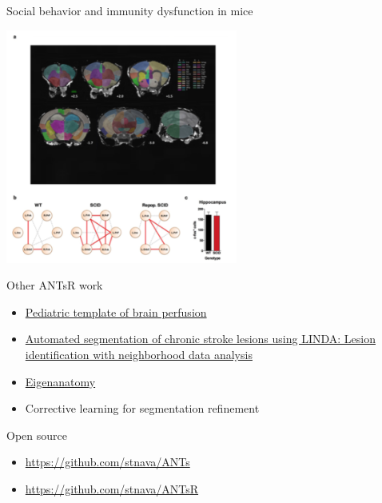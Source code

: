 \documentclass[ignorenonframetext,]{beamer}
\providecommand{\tightlist}{%
\setlength{\itemsep}{0pt}\setlength{\parskip}{0pt}}
\begin{document}
\begin{frame}{Social behavior and immunity dysfunction in mice}

\begin{centering}

\includegraphics[width=3in]{./antsr/figures/filiano_rsfmri.png}

\end{centering}

\end{frame}

\begin{frame}{Other ANTsR work}

\begin{itemize}
\item
  \href{http://www.nature.com/articles/sdata20153}{Pediatric template of
  brain perfusion}
\item
  \href{http://www.ncbi.nlm.nih.gov/pubmed/26756101}{Automated
  segmentation of chronic stroke lesions using LINDA: Lesion
  identification with neighborhood data analysis}
\item
  \href{http://www.ncbi.nlm.nih.gov/pubmed/25448483}{Eigenanatomy}
\item
  Corrective learning for segmentation refinement
\end{itemize}

\end{frame}

\begin{frame}{Open source}

\begin{itemize}
\tightlist
\item
  \url{https://github.com/stnava/ANTs}
\item
  \url{https://github.com/stnava/ANTsR}
\end{itemize}

\hypertarget{refs}{}

\end{frame}
\end{document}
